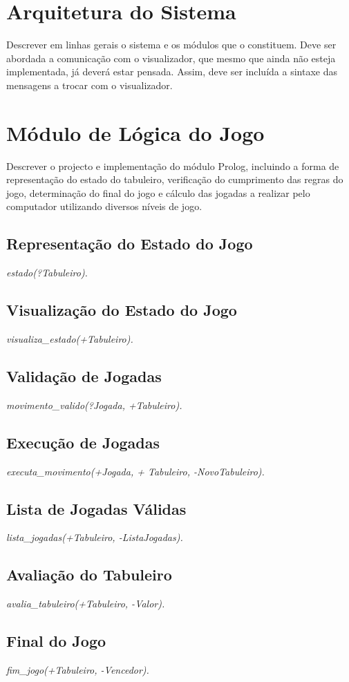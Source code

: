 \documentclass[15pt,a4paper]{article}
\begin{document}
\section{Arquitetura do Sistema}
Descrever em linhas gerais o sistema e os módulos que o constituem. Deve ser abordada a comunicação com o visualizador, que mesmo que ainda não esteja implementada, já deverá estar pensada. Assim, deve ser incluída a sintaxe das mensagens a trocar com o visualizador.

\section{Módulo de Lógica do Jogo}
Descrever o projecto e implementação do módulo Prolog, incluindo a forma de representação do estado do tabuleiro,  verificação do cumprimento das regras do jogo, determinação do final do jogo e cálculo das jogadas a realizar pelo computador  utilizando diversos níveis de jogo.

\subsection{Representação do Estado do Jogo} \textit{estado(?Tabuleiro).}
\subsection{Visualização do Estado do Jogo} \textit{visualiza\_estado(+Tabuleiro).}
\subsection{Validação de Jogadas} \textit{movimento\_valido(?Jogada, +Tabuleiro).}
\subsection{Execução de Jogadas}\textit{executa\_movimento(+Jogada, + Tabuleiro, -NovoTabuleiro).}
\subsection{Lista de Jogadas Válidas}\textit{lista\_jogadas(+Tabuleiro, -ListaJogadas).}
\subsection{Avaliação do Tabuleiro}\textit{avalia\_tabuleiro(+Tabuleiro, -Valor).}
\subsection{Final do Jogo} \textit{fim\_jogo(+Tabuleiro, -Vencedor).}
\end{document}
